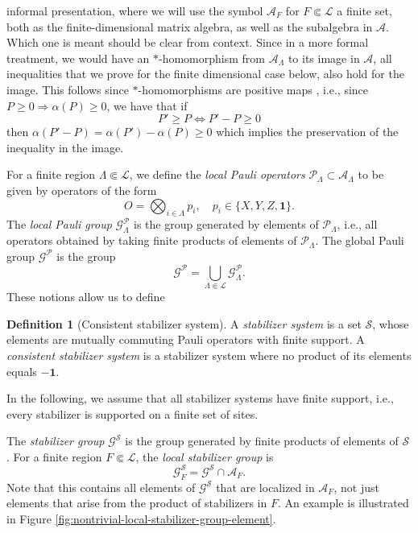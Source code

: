 \documentclass[aps,pra,reprint,superscriptaddress]{revtex4-2}
\newcommand{\cA}{{\mathcal A}}
\newcommand{\cG}{{\mathcal G}}
\newcommand{\cL}{{\mathcal L}}
\newcommand{\cP}{{\mathcal P}}
\newcommand{\cS}{{\mathcal S}}
\renewcommand\a{\alpha}
\renewcommand\L{\Lambda}
\newcommand{\id}{\mathbf 1}
\theoremstyle{definition}
\newtheorem{definition}[theorem]{Definition}
\theoremstyle{remark}
\begin{document}
informal presentation, where we will use the symbol $\cA_F$ for $F \Subset \cL$ a
finite set, both as the finite-dimensional matrix algebra, as well as the
subalgebra in $\cA$. Which one is meant should be clear from context. Since in
a more formal treatment, we would have an $\ast$-homomorphism from $\cA_{\L}$
to its image in $\cA$, all inequalities that we prove for the finite
dimensional case below, also hold for the image. This follows since
$\ast$-homomorphisms are positive maps \cite[Section 4.2]{KadisonRingrose1}, i.e., since $P \geq 0 \Rightarrow  \a(P) \geq 0$, we have that if 
\begin{equation}
    P' \geq P \Leftrightarrow P'-P \geq 0
\end{equation}
then $\a(P'-P) = \a(P') -\a(P) \geq 0$ which implies the preservation of the
inequality in the image.

For a finite region $\L \Subset \cL$, we define the \emph{local
Pauli operators} $\cP_\L \subset \cA_\L$ to be given by operators of the form 
\begin{equation}
    O = \bigotimes_{i \in \L} p_i, \quad p_i \in \{X,Y,Z,\id\}.
\end{equation}
The \emph{local Pauli group} $\cG^{\cP}_\L$ is the group generated by elements
of $\cP_\L$, i.e., all operators obtained by taking finite products of
elements of $\cP_\L$. The global Pauli group $\cG^{\cP}$ is the group 
\begin{equation}
    \cG^{\cP} = \bigcup_{\L\Subset\cL} \cG^{\cP}_\L.
\end{equation}
These notions allow us to define 
\begin{definition}[Consistent stabilizer system]
A \emph{stabilizer system} is a set $\cS$, whose elements are mutually
commuting Pauli operators with finite support. A \emph{consistent stabilizer
system} is a stabilizer system where no product of its elements equals
$-\id$.     
\end{definition}
In the following, we assume that all stabilizer systems have finite
support, i.e., every stabilizer is supported on a finite set of sites.

The \emph{stabilizer group} $\cG^{\cS}$ is the group generated by finite
products of elements of $\cS$. For a finite region $F\Subset\cL$, the
\emph{local stabilizer group} is
\begin{equation}\label{eq:local_stabilizer_group}
    \cG^{\cS}_{F}=\cG^{\cS}\cap\cA_F.
\end{equation}
Note that this contains all elements of $\cG^\cS$ that are localized in $\cA_F$, not just elements that arise from the product of stabilizers in $F$. An example is illustrated in Figure \ref{fig:nontrivial-local-stabilizer-group-element}.
\end{document}
